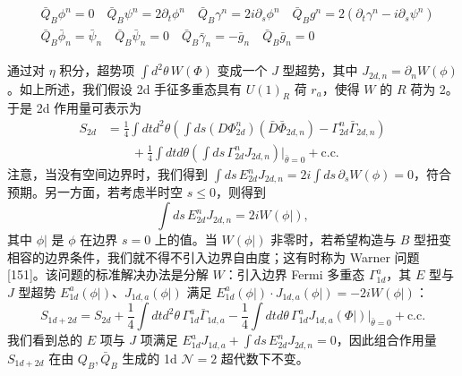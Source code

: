 \begin{equation}\tag{C.11}
  \begin{aligned}
  &\bar Q_B\phi^n=0\quad \bar Q_B\psi^n=2\partial_t\phi^n\quad \bar Q_B\gamma^n=2i\partial_s\phi^n\quad \bar Q_Bg^n=2(\partial_t\gamma^n-i\partial_s\psi^n)\\
  &\bar Q_B\bar\phi_n=\bar\psi_n\quad \bar Q_B\bar\psi_n=0\quad \bar Q_B\bar\gamma_n=-\bar g_n\quad \bar Q_B\bar g_n=0
  \end{aligned}
\end{equation}

通过对 $\eta$ 积分，超势项 $\int d^2\theta\,W(\Phi)$ 变成一个 $J$ 型超势，其中 $J_{2d,n}=\partial_nW(\phi)$。如上所述，我们假设 2d 手征多重态具有 $U(1)_R$ 荷 $r_a$，使得 $W$ 的 $R$ 荷为 2。于是 2d 作用量可表示为
\begin{equation}\tag{C.12}
  \begin{aligned}
  S_{2d}&=\frac{1}{4}\int dtd^2\theta\left(\int ds(D\Phi^n_{2d})(\bar D\bar\Phi_{2d,n})-\Gamma^n_{2d}\bar\Gamma_{2d,n}\right)\\
  &\qquad+\frac{1}{4}\int dtd\theta\left(\int ds\,\Gamma^n_{2d}J_{2d,n}\right)\Big|_{\bar\theta=0}+\text{c.c.}
  \end{aligned}
\end{equation}
注意，当没有空间边界时，我们得到 $\int ds\,E^n_{2d}J_{2d,n}=2i\int ds\,\partial_sW(\phi)=0$，符合预期。另一方面，若考虑半时空 $s\leq0$，则得到
\begin{equation}\tag{C.13}
  \int ds\,E^n_{2d}J_{2d,n}=2iW(\phi|),
\end{equation}
其中 $\phi|$ 是 $\phi$ 在边界 $s=0$ 上的值。当 $W(\phi|)$ 非零时，若希望构造与 $B$ 型扭变相容的边界条件，我们就不得不引入边界自由度；这有时称为 Warner 问题 [151]。该问题的标准解决办法是分解 $W$：引入边界 Fermi 多重态 $\Gamma^a_{1d}$，其 $E$ 型与 $J$ 型超势 $E^a_{1d}(\phi|)$、$J_{1d,a}(\phi|)$ 满足 $E^a_{1d}(\phi|)\cdot J_{1d,a}(\phi|)=-2iW(\phi|)$：
\begin{equation}\tag{C.14}
  S_{1d+2d}=S_{2d}+\frac{1}{4}\int dtd^2\theta\,\Gamma^a_{1d}\bar\Gamma_{1d,a}-\frac{1}{4}\int dtd\theta\,\Gamma^a_{1d}J_{1d,a}(\Phi|)\Big|_{\bar\theta=0}+\text{c.c.}
\end{equation}
我们看到总的 $E$ 项与 $J$ 项满足 $E^a_{1d}J_{1d,a}+\int ds\,E^n_{2d}J_{2d,n}=0$，因此组合作用量 $S_{1d+2d}$ 在由 $Q_B,\bar Q_B$ 生成的 1d $\mathcal{N}=2$ 超代数下不变。


